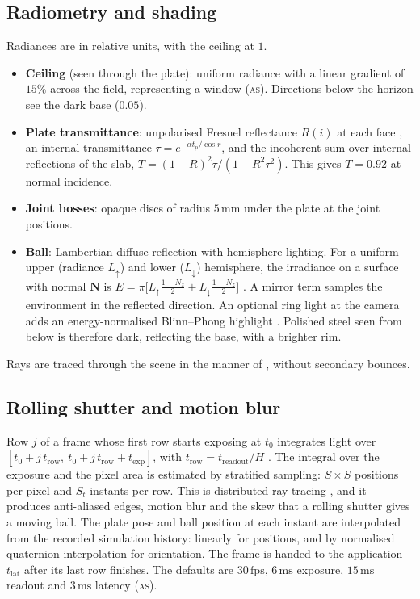 \documentclass[10pt,a4paper]{article}
\newcommand{\un}[1]{\,\mathrm{#1}}
\newcommand{\vect}[1]{\bm{#1}}
\newcommand{\tagAS}{\textsc{as}}
\begin{document}
\subsection{Radiometry and shading}
Radiances are in relative units, with the ceiling at $1$.
\begin{itemize}
  \item \textbf{Ceiling} (seen through the plate): uniform radiance with a linear gradient of
        $15\%$ across the field, representing a window (\tagAS). Directions below the horizon see
        the dark base ($0.05$).
  \item \textbf{Plate transmittance}: unpolarised Fresnel reflectance $R(i)$ at each face
        \citep{hecht2017optics}, an internal transmittance $\tau=e^{-\alpha t_p/\cos r}$, and the
        incoherent sum over internal reflections of the slab,
        $T=(1-R)^2\tau/(1-R^2\tau^2)$. This gives $T=0.92$ at normal incidence.
  \item \textbf{Joint bosses}: opaque discs of radius $5\un{mm}$ under the plate at the joint
        positions.
  \item \textbf{Ball}: Lambertian diffuse reflection with hemisphere lighting. For a uniform
        upper (radiance $L_\uparrow$) and lower ($L_\downarrow$) hemisphere, the irradiance on a
        surface with normal $\vect N$ is
        $E=\pi\bigl[L_\uparrow\frac{1+N_z}{2}+L_\downarrow\frac{1-N_z}{2}\bigr]$
        \citep{pharr2016physically}. A mirror term samples the environment in the reflected
        direction. An optional ring light at the camera adds an energy-normalised Blinn--Phong
        highlight \citep{blinn1977models}. Polished steel seen from below is therefore dark,
        reflecting the base, with a brighter rim.
\end{itemize}
Rays are traced through the scene in the manner of \citet{whitted1980improved}, without
secondary bounces.

\subsection{Rolling shutter and motion blur}
Row $j$ of a frame whose first row starts exposing at $t_0$ integrates light over
$[t_0+j\,t_{\mathrm{row}},\ t_0+j\,t_{\mathrm{row}}+t_{\exp}]$, with
$t_{\mathrm{row}}=t_{\mathrm{readout}}/H$ \citep{liang2008analysis}. The integral over the
exposure and the pixel area is estimated by stratified sampling: $S\times S$ positions per
pixel and $S_t$ instants per row. This is distributed ray tracing
\citep{cook1984distributed}, and it produces anti-aliased edges, motion blur and the skew that
a rolling shutter gives a moving ball. The plate pose and ball position at each instant are
interpolated from the recorded simulation history: linearly for positions, and by normalised
quaternion interpolation for orientation. The frame is handed to the application
$t_{\mathrm{lat}}$ after its last row finishes. The defaults are $30\un{fps}$, $6\un{ms}$
exposure, $15\un{ms}$ readout and $3\un{ms}$ latency (\tagAS).
\end{document}
